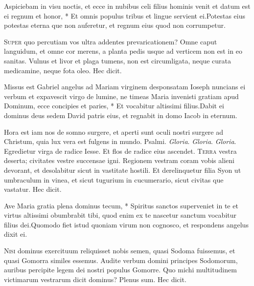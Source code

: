 \begin{multicols*}{2}
\begin{responsory}[aspiciebam]
{Aspiciebam in visu noctis, et ecce in nubibus celi filius hominis venit et datum est ei regnum et honor, * Et omnis populus tribus et lingue servient ei.}{Potestas eius potestas eterna que non auferetur, et regnum eius quod non corrumpetur.}
\end{responsory}
\lettrine[lines=2]{\zallmancaps \color{Blue} S}{uper} quo percutiam vos ultra addentes prevaricationem? Omne caput languidum, et omne cor merens, a planta pedis usque ad verticem non est in eo sanitas. Vulnus et livor et plaga tumens, non est circumligata, neque curata medicamine, neque fota oleo. Hec dicit.
\begin{responsory-doxology}
{Missus est Gabriel angelus ad Mariam virginem desponsatam Ioseph nuncians ei verbum et expavescit virgo de lumine, ne timeas Maria invenisti gratiam apud Dominum, ecce concipies et paries, * Et vocabitur altissimi filius.}{Dabit ei dominus deus sedem David patris eius, et regnabit in domo Iacob in eternum.}
\end{responsory-doxology}
 Hora est iam nos de somno surgere, et aperti sunt oculi nostri surgere ad Christum, quia lux vera est fulgens in mundo. {\color{Red} Psalmi.}
 \textit{Gloria}.
 \textit{Gloria}.
 \textit{Gloria}. \V Egredietur virga de radice Iesse. \R Et flos de radice eius ascendet.
\lettrine[lines=2]{\zallmancaps \color{Red} T}{erra} vestra deserta; civitates vestre succensae igni. Regionem vestram coram vobis alieni
devorant, et desolabitur sicut in vastitate hostili. Et derelinquetur filia Syon ut umbraculum in vinea, et sicut tugurium in cucumerario, sicut civitas que vastatur. Hec dicit.
\begin{responsory}
{Ave Maria gratia plena dominus tecum, * Spiritus sanctos superveniet in te et virtus altissimi obumbrabit tibi, quod enim ex te nascetur sanctum vocabitur filius dei.}{Quomodo fiet istud quoniam virum non cognosco, et respondens angelus dixit ei.}
\end{responsory}
\lettrine[lines=2]{\zallmancaps \color{Blue} N}{isi} dominus exercituum reliquisset nobis semen, quasi Sodoma fuissemus, et quasi Gomorra similes essemus. Audite verbum domini principes Sodomorum, auribus percipite legem dei nostri populus Gomorre. Quo michi multitudinem victimarum vestrarum dicit dominus? Plenus sum. Hec dicit.

\end{multicols*}
